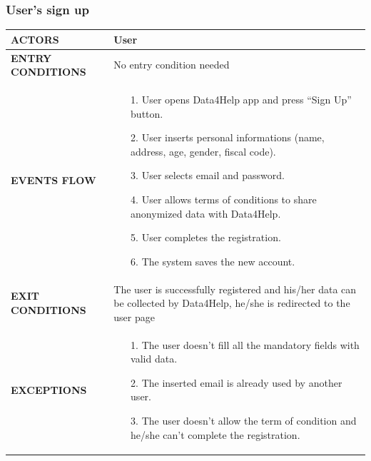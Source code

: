 \documentclass[a4paper]{article}
\begin{document}
\subsubsection{User's sign up}
\begin{center}
    \begin{tabular}{ l || p{8cm} ||}
        \bf{ACTORS} & User \\ 
        \hline
        \bf{ENTRY CONDITIONS} & No entry condition needed  \\ 
        \hline
        \bf{EVENTS FLOW} & \begin{itemize}[noitemsep, topsep=0cm, leftmargin=*] \vspace{-0.2cm}
            \item[1.] User opens Data4Help app and press “Sign Up” button.
            \item[2.] User inserts personal informations (name, address, age, gender, fiscal code).
            \item[3.] User selects email and password.
            \item[4.] User allows terms of conditions to share anonymized data with Data4Help.
            \item[5.] User completes the registration.
            \item[6.] The system saves the new account.
        \end{itemize}\\ 
        \hline
        \bf{EXIT CONDITIONS} & The user is successfully registered and his/her data can be collected by Data4Help, he/she is redirected to the user page\\ \hline
        \bf{EXCEPTIONS} & \begin{itemize}[noitemsep, topsep=0cm, leftmargin=*] \vspace{-0.2cm}
            \item[1.] The user doesn’t fill all the mandatory fields with valid data.
            \item[2.]The inserted email is already used by another user.
            \item[3.] The user doesn’t allow the term of condition and he/she can’t complete the registration.
        \end{itemize}
        \\ \hline \hline
    \end{tabular}
\end{center}

\vspace{1cm}
\end{document}

